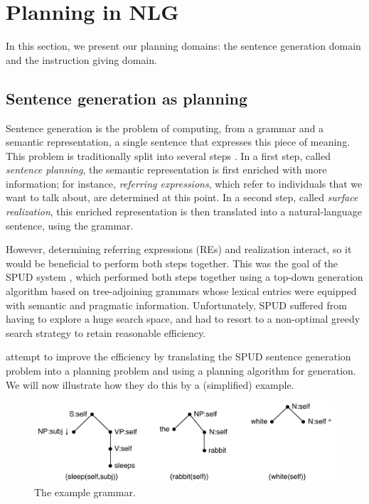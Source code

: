 \section{Planning in NLG} \label{sec:domains}

In this section, we present our planning domains: the sentence
generation domain and the instruction giving domain.


\subsection{Sentence generation as planning}

Sentence generation is the problem of computing, from a grammar and a
semantic representation, a single sentence that expresses this piece
of meaning.  This problem is traditionally split into several steps
\cite{reiter00building}.  In a first step, called \emph{sentence
  planning}, the semantic representation is first enriched with more
information; for instance, \emph{referring expressions}, which refer
to individuals that we want to talk about, are determined at this
point.  In a second step, called \emph{surface realization}, this
enriched representation is then translated into a natural-language
sentence, using the grammar.

However, determining referring expressions (REs) and realization
interact, so it would be beneficial to perform both steps together.
This was the goal of the SPUD system \cite{Stone2003a}, which
performed both steps together using a top-down generation algorithm
based on tree-adjoining grammars \cite{joshi;etal1997} whose lexical
entries were equipped with semantic and pragmatic information.
Unfortunately, SPUD suffered from having to explore a huge search
space, and had to resort to a non-optimal greedy search strategy to
retain reasonable efficiency.

\cite{KolSto07} attempt to improve the efficiency by translating the
SPUD sentence generation problem into a planning problem and using a
planning algorithm for generation.  We will now illustrate how they do
this by a (simplified) example.

\begin{figure}
  \centering
  \includegraphics[width=\columnwidth]{pic-grammar}
  \caption{The example grammar.}
  \label{fig:white-rabbit-sleeps-grammar}
\end{figure}

